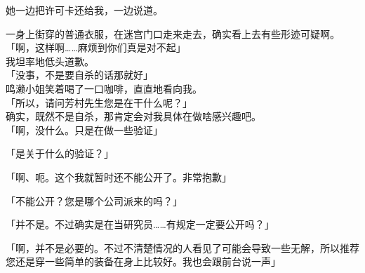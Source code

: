 她一边把许可卡还给我，一边说道。

一身上街穿的普通衣服，在迷宫门口走来走去，确实看上去有些形迹可疑啊。\\

「啊，这样啊……麻烦到你们真是对不起」\\

我坦率地低头道歉。\\

「没事，不是要自杀的话那就好」\\

鸣濑小姐笑着喝了一口咖啡，直直地看向我。\\

「所以，请问芳村先生您是在干什么呢？」\\

确实，既然不是自杀，那肯定会对我具体在做啥感兴趣吧。\\

「啊，没什么。只是在做一些验证」

「是关于什么的验证？」

「啊、呃。这个我就暂时还不能公开了。非常抱歉」

「不能公开？您是哪个公司派来的吗？」

「并不是。不过确实是在当研究员……有规定一定要公开吗？」

「啊，并不是必要的。不过不清楚情况的人看见了可能会导致一些无解，所以推荐您还是穿一些简单的装备在身上比较好。我也会跟前台说一声」

